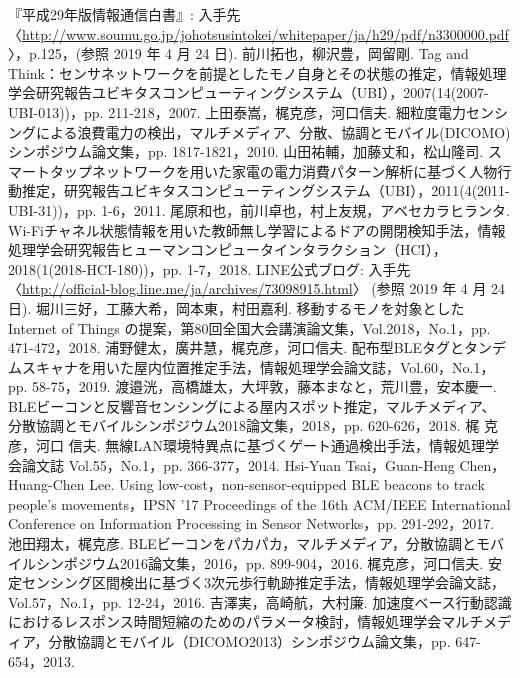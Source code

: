 \documentclass[Japanese]{dicomopapers}
\begin{document}
\begin{thebibliography}{20}
    『平成29年版情報通信白書』: 入手先 〈\url{http://www.soumu.go.jp/johotsusintokei/whitepaper/ja/h29/pdf/n3300000.pdf}〉，p.125，(参照 2019 年 4 月 24 日).
    前川拓也，柳沢豊，岡留剛. Tag and Think：センサネットワークを前提としたモノ自身とその状態の推定，情報処理学会研究報告ユビキタスコンピューティングシステム（UBI），2007(14(2007-UBI-013))，pp. 211-218，2007.
    上田泰嵩，梶克彦，河口信夫. 細粒度電力センシングによる浪費電力の検出，マルチメディア、分散、協調とモバイル(DICOMO)シンポジウム論文集，pp. 1817-1821，2010.
    山田祐輔，加藤丈和，松山隆司. スマートタップネットワークを用いた家電の電力消費パターン解析に基づく人物行動推定，研究報告ユビキタスコンピューティングシステム（UBI），2011(4(2011-UBI-31))，pp. 1-6，2011.
    尾原和也，前川卓也，村上友規，アベセカラヒランタ. Wi-Fiチャネル状態情報を用いた教師無し学習によるドアの開閉検知手法，情報処理学会研究報告ヒューマンコンピュータインタラクション（HCI），2018(1(2018-HCI-180))，pp. 1-7，2018.
    LINE公式ブログ: 入手先 〈\url{http://official-blog.line.me/ja/archives/73098915.html}〉 (参照 2019 年 4 月 24 日).
    堀川三好，工藤大希，岡本東，村田嘉利. 移動するモノを対象とした Internet of Things の提案，第80回全国大会講演論文集，Vol.2018，No.1，pp. 471-472，2018.
    浦野健太，廣井慧，梶克彦，河口信夫. 配布型BLEタグとタンデムスキャナを用いた屋内位置推定手法，情報処理学会論文誌，Vol.60，No.1，pp. 58-75，2019.
    渡邉洸，高橋雄太，大坪敦，藤本まなと，荒川豊，安本慶一. BLEビーコンと反響音センシングによる屋内スポット推定，マルチメディア、 分散協調とモバイルシンポジウム2018論文集，2018，pp. 620-626，2018.
    梶 克彦，河口 信夫. 無線LAN環境特異点に基づくゲート通過検出手法，情報処理学会論文誌 Vol.55，No.1，pp. 366-377，2014.
    Hsi-Yuan Tsai，Guan-Heng Chen，Huang-Chen Lee. Using low-cost，non-sensor-equipped BLE beacons to track people's movements，IPSN '17 Proceedings of the 16th ACM/IEEE International Conference on Information Processing in Sensor Networks，pp. 291-292，2017.
    池田翔太，梶克彦. BLEビーコンをパカパカ，マルチメディア，分散協調とモバイルシンポジウム2016論文集，2016，pp. 899-904，2016.
    梶克彦，河口信夫. 安定センシング区間検出に基づく3次元歩行軌跡推定手法，情報処理学会論文誌，Vol.57，No.1，pp. 12-24，2016.
    吉澤実，高崎航，大村廉. 加速度ベース行動認識におけるレスポンス時間短縮のためのパラメータ検討，情報処理学会マルチメディア，分散協調とモバイル（DICOMO2013）シンポジウム論文集，pp. 647-654，2013.
\end{thebibliography}
\end{document}
